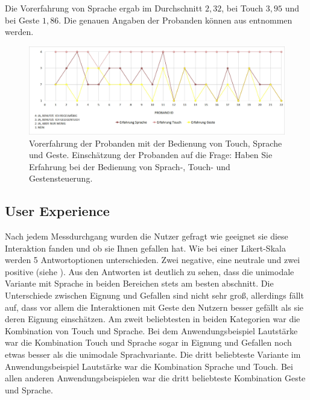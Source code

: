 Die Vorerfahrung von Sprache ergab im Durchschnitt $2,32$, bei Touch $3,95$ und bei Geste $1,86$. Die genauen Angaben der Probanden können aus  entnommen werden.
\begin{figure}[ht]
  \centering
  \includegraphics[width=1\textwidth]{img/ErfahrungProbanden2.jpg}
  \caption[Vorerfahrung der Probanden]{Vorerfahrung der Probanden mit der Bedienung von Touch, Sprache und Geste. Einschätzung der Probanden auf die Frage: Haben Sie Erfahrung bei der Bedienung von Sprach-, Touch- und Gestensteuerung.}
  \label{fig:Vorerfahrung}
\end{figure}

\subsection[User Experience]{User Experience}
Nach jedem Messdurchgang wurden die Nutzer gefragt wie geeignet sie diese Interaktion fanden und ob sie Ihnen gefallen hat. 
Wie bei einer Likert-Skala werden 5 Antwortoptionen unterschieden. Zwei negative, eine neutrale und zwei positive (siehe ). 
Aus den Antworten ist deutlich zu sehen, dass die unimodale Variante mit Sprache in beiden Bereichen stets am besten abschnitt. 
Die Unterschiede zwischen Eignung und Gefallen sind nicht sehr groß, allerdings fällt auf, dass vor allem die Interaktionen mit Geste den Nutzern besser gefällt als sie deren Eignung einschätzen. 
Am zweit beliebtesten in beiden Kategorien war die Kombination von Touch und Sprache. 
Bei dem Anwendungsbeispiel Lautstärke war die Kombination Touch und Sprache sogar in Eignung und Gefallen noch etwas besser als die unimodale Sprachvariante. 
Die dritt beliebteste Variante im Anwendungsbeispiel Lautstärke war die Kombination Sprache und Touch. 
Bei allen anderen Anwendungsbeispielen war die dritt beliebteste Kombination Geste und Sprache. 

